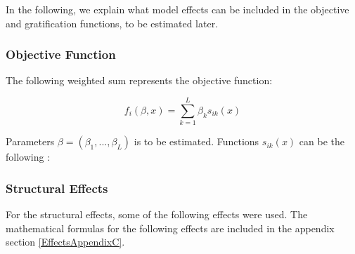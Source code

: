 \documentclass[12pt,letterpaper]{gthesis2}  %
\begin{document}
In the following, we explain what model effects can be included in the objective and gratification functions, to be estimated later.

\subsubsection*{Objective Function}
The following weighted sum represents the objective function:

\begin{equation}
f_i(\beta, x) = \sum_{k = 1}^{L} \beta_k s_{ik}(x)
\end{equation}

Parameters $\beta = (\beta_1, ..., \beta_L)$ is to be estimated. Functions $s_{ik}(x)$ can be the following \cite{Snijders2004}:

\subsubsection{Structural Effects}
For the structural effects, some of the following effects were used. The mathematical formulas for the following effects are included in the appendix section \ref{EffectsAppendixC}. 
\end{document}
